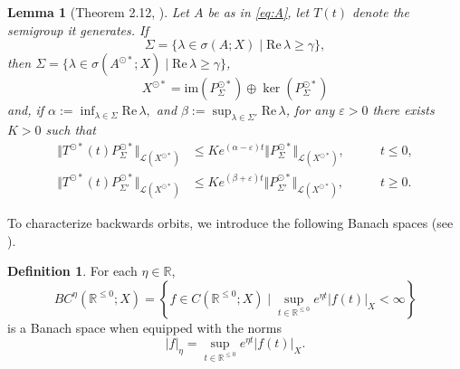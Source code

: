 \documentclass[a4paper, 12pt, oneside, reqno, notitlepage]{amsart}
\theoremstyle{plain}
\newtheorem{lemma}[theorem]{Lemma}
\theoremstyle{definition}
\newtheorem{definition}[theorem]{Definition}
\theoremstyle{remark}
\newcommand{\im}{\mathrm{im}}
\begin{document}
\begin{lemma}[Theorem 2.12, \cite{diekmann2012delay}] \label{lemma:appendixdichotomy}
    Let $A$ be as in \eqref{eq:A}, let $T(t)$ denote the semigroup it generates.
    If 
    \begin{displaymath}
         \Sigma = \{ \lambda \in \sigma(A;X) \; | \; \mathrm{Re} \, \lambda \geq \gamma \},
    \end{displaymath}
    then $\Sigma = \{ \lambda \in \sigma(A^{\odot *};X) \; | \; \mathrm{Re} \, \lambda \geq \gamma \}$,
    \begin{displaymath}
        X^{\odot *} = \im (P^{\odot *}_\Sigma) \oplus \ker (P^{\odot *}_\Sigma)
    \end{displaymath}
    and, if $\alpha :=\inf_{\lambda \in \Sigma} \mathrm{Re} \, \lambda,$ and $\beta := \sup_{\lambda \in \Sigma'} \mathrm{Re} \, \lambda$,
    for any $\varepsilon > 0$ there exists $K > 0$ such that
     \begin{subequations}\label{eq:dichotomy_appendix}
     \begin{align}
         \Vert T^{\odot *}(t) P_\Sigma^{\odot *} \Vert_{\mathcal{L}(X^{\odot *})} &\leq K e^{(\alpha -\varepsilon)t} \Vert P_{\Sigma}^{\odot *} \Vert_{\mathcal{L}(X^{\odot *})}, \qquad &t \leq 0,  \label{eq:dichotomyapp1}\\ 
         \Vert T^{\odot *}(t)P_{\Sigma'}^{\odot *} \Vert_{\mathcal{L}(X^{\odot *})} &\leq K e^{(\beta+\varepsilon) t} \Vert P_{\Sigma'}^{\odot *}\Vert_{\mathcal{L}(X^{\odot *})}, \qquad &t \geq 0. \label{eq:dichotomyapp2} 
     \end{align}    
     \end{subequations}
\end{lemma}

To characterize backwards orbits, we introduce the following Banach spaces (see  \cite{vanderbauwhede1987center}).

\begin{definition} \label{def:BC}
    For each $\eta \in \mathbb{R}$, 
\begin{displaymath}
    BC^\eta (\mathbb{R}^{\leq 0};X) = \left\{ f \in C(\mathbb{R}^{\leq 0};X) \; \Big| \; \sup_{t \in \mathbb{R}^{\leq 0}} e^{\eta t} |f(t)|_X < \infty\right\}
\end{displaymath}
is a Banach space when equipped with the norms
\begin{displaymath}
    | f |_\eta = \sup_{t \in \mathbb{R}^{\leq 0}} e^{\eta t} |f(t)|_X.
\end{displaymath}
\end{definition}
\end{document}
